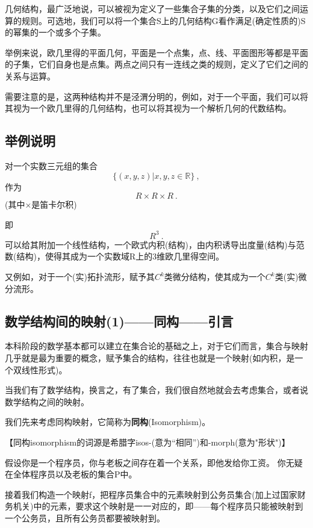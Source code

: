 几何结构，最广泛地说，可以被视为定义了一些集合子集的分类，以及它们之间运算的规则。可选地，我们可以将一个集合S上的几何结构G看作满足(确定性质的)S的幂集的一个或多个子集。 

举例来说，欧几里得的平面几何，平面是一个点集，点、线、平面图形等都是平面的子集，它们自身也是点集。两点之间只有一连线之类的规则，定义了它们之间的关系与运算。

需要注意的是，这两种结构并不是泾渭分明的，例如，对于一个平面，我们可以将其视为一个欧几里得的几何结构，也可以将其视为一个解析几何的代数结构。

\subsection{举例说明}
对一个实数三元组的集合
\begin{equation}
\{(x,y,z)|x,y,z \in {\mathbb R} \}~,
\end{equation}
作为
\begin{equation}
R \times R \times R~.
\end{equation}
(其中×是笛卡尔积)

即\begin{equation}
R^3~.
\end{equation}
可以给其附加一个线性结构，一个欧式内积(结构)，由内积诱导出度量(结构)与范数(结构)，使得其成为一个实数域R上的3维欧几里得空间。 

又例如，对于一个(实)拓扑流形，赋予其$C^k$类微分结构，使其成为一个$C^k$类(实)微分流形。

\subsection{数学结构间的映射(1)——同构——引言}
本科阶段的数学基本都可以建立在集合论的基础之上，对于它们而言，集合与映射几乎就是最为重要的概念，赋予集合的结构，往往也就是一个映射(如内积，是一个双线性形式)。

当我们有了数学结构，换言之，有了集合，我们很自然地就会去考虑集合，或者说数学结构之间的映射。

我们先来考虑同构映射，它简称为\textbf{同构}(Isomorphism)。

【同构isomorphism的词源是希腊字isos-(意为“相同”)和-morph(意为"形状")】

假设你是一个程序员，你与老板之间存在着一个关系，即他发给你工资。
你无疑在全体程序员以及老板的集合P中。

接着我们构造一个映射f，把程序员集合中的元素映射到公务员集合(加上过国家财务机关)中的元素，要求这个映射是一一对应的，即——每个程序员只能被映射到一个公务员，且所有公务员都要被映射到。

